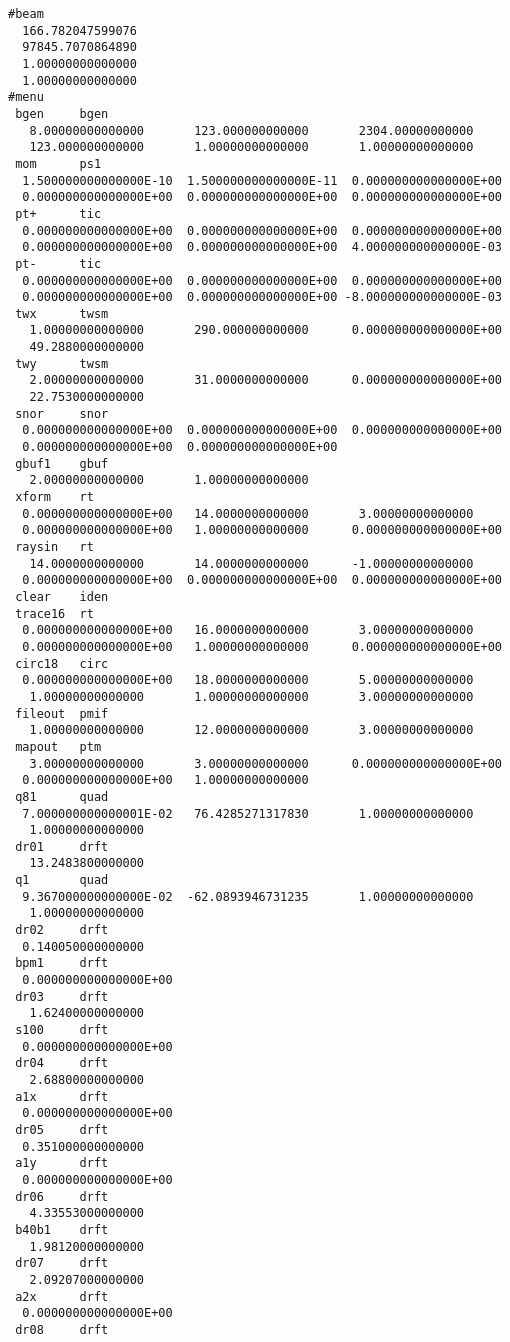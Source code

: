 \begin{footnotesize}
\begin{verbatim}
#beam
  166.782047599076
  97845.7070864890
  1.00000000000000
  1.00000000000000
#menu
 bgen     bgen
   8.00000000000000       123.000000000000       2304.00000000000
   123.000000000000       1.00000000000000       1.00000000000000
 mom      ps1
  1.500000000000000E-10  1.500000000000000E-11  0.000000000000000E+00
  0.000000000000000E+00  0.000000000000000E+00  0.000000000000000E+00
 pt+      tic
  0.000000000000000E+00  0.000000000000000E+00  0.000000000000000E+00
  0.000000000000000E+00  0.000000000000000E+00  4.000000000000000E-03
 pt-      tic
  0.000000000000000E+00  0.000000000000000E+00  0.000000000000000E+00
  0.000000000000000E+00  0.000000000000000E+00 -8.000000000000000E-03
 twx      twsm
   1.00000000000000       290.000000000000      0.000000000000000E+00
   49.2880000000000
 twy      twsm
   2.00000000000000       31.0000000000000      0.000000000000000E+00
   22.7530000000000
 snor     snor
  0.000000000000000E+00  0.000000000000000E+00  0.000000000000000E+00
  0.000000000000000E+00  0.000000000000000E+00
 gbuf1    gbuf
   2.00000000000000       1.00000000000000
 xform    rt
  0.000000000000000E+00   14.0000000000000       3.00000000000000
  0.000000000000000E+00   1.00000000000000      0.000000000000000E+00
 raysin   rt
   14.0000000000000       14.0000000000000      -1.00000000000000
  0.000000000000000E+00  0.000000000000000E+00  0.000000000000000E+00
 clear    iden
 trace16  rt
  0.000000000000000E+00   16.0000000000000       3.00000000000000
  0.000000000000000E+00   1.00000000000000      0.000000000000000E+00
 circ18   circ
  0.000000000000000E+00   18.0000000000000       5.00000000000000
   1.00000000000000       1.00000000000000       3.00000000000000
 fileout  pmif
   1.00000000000000       12.0000000000000       3.00000000000000
 mapout   ptm
   3.00000000000000       3.00000000000000      0.000000000000000E+00
  0.000000000000000E+00   1.00000000000000
 q81      quad
  7.000000000000001E-02   76.4285271317830       1.00000000000000
   1.00000000000000
 dr01     drft
   13.2483800000000
 q1       quad
  9.367000000000000E-02  -62.0893946731235       1.00000000000000
   1.00000000000000
 dr02     drft
  0.140050000000000
 bpm1     drft
  0.000000000000000E+00
 dr03     drft
   1.62400000000000
 s100     drft
  0.000000000000000E+00
 dr04     drft
   2.68800000000000
 a1x      drft
  0.000000000000000E+00
 dr05     drft
  0.351000000000000
 a1y      drft
  0.000000000000000E+00
 dr06     drft
   4.33553000000000
 b40b1    drft
   1.98120000000000
 dr07     drft
   2.09207000000000
 a2x      drft
  0.000000000000000E+00
 dr08     drft

\end{verbatim}
\end{footnotesize}
